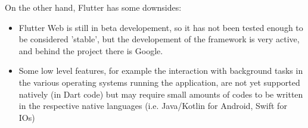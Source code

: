 On the other hand, Flutter has some downsides:
\begin{itemize}
    \item Flutter Web is still in beta developement, so it has not been tested enough to be considered 'stable', but the developement of the framework is very active, and behind the project there is Google.
    \item Some low level features, for example the interaction with background tasks in the various operating systems running the application, are not yet supported natively (in Dart code) but may require small amounts of codes to be written in the respective native languages (i.e. Java/Kotlin for Android, Swift for IOs)
\end{itemize}